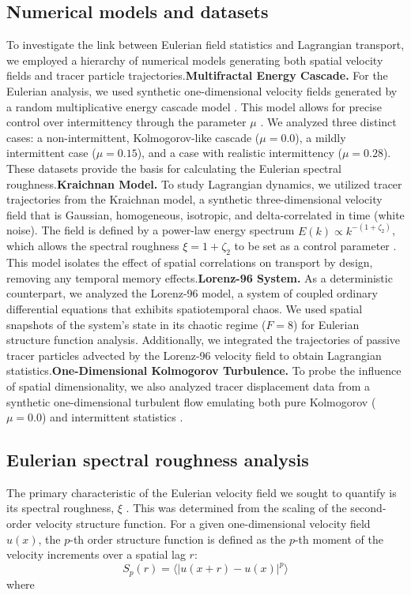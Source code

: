 \documentclass[]{article}
\begin{document}
\subsection{Numerical models and datasets}To investigate the link between Eulerian field statistics and Lagrangian transport, we employed a hierarchy of numerical models generating both spatial velocity fields and tracer particle trajectories.\noindent\textbf{Multifractal Energy Cascade.} For the Eulerian analysis, we used synthetic one-dimensional velocity fields generated by a random multiplicative energy cascade model  \citep{shivamoggi2022generalizedfractaldimensiondissipative}. This model allows for precise control over intermittency through the parameter $\mu$  \citep{arreola2024currentstateatmosphericturbulence}. We analyzed three distinct cases: a non-intermittent, Kolmogorov-like cascade ($\mu=0.0$), a mildly intermittent case ($\mu=0.15$), and a case with realistic intermittency ($\mu=0.28$). These datasets provide the basis for calculating the Eulerian spectral roughness.\noindent\textbf{Kraichnan Model.} To study Lagrangian dynamics, we utilized tracer trajectories from the Kraichnan model, a synthetic three-dimensional velocity field that is Gaussian, homogeneous, isotropic, and delta-correlated in time (white noise). The field is defined by a power-law energy spectrum $E(k) \propto k^{-(1+\zeta_2)}$, which allows the spectral roughness $\xi = 1 + \zeta_2$ to be set as a control parameter  \citep{considera2025transportmultifractalkraichnanflows}. This model isolates the effect of spatial correlations on transport by design, removing any temporal memory effects.\noindent\textbf{Lorenz-96 System.} As a deterministic counterpart, we analyzed the Lorenz-96 model, a system of coupled ordinary differential equations that exhibits spatiotemporal chaos. We used spatial snapshots of the system's state in its chaotic regime ($F=8$) for Eulerian structure function analysis. Additionally, we integrated the trajectories of passive tracer particles advected by the Lorenz-96 velocity field to obtain Lagrangian statistics.\noindent\textbf{One-Dimensional Kolmogorov Turbulence.} To probe the influence of spatial dimensionality, we also analyzed tracer displacement data from a synthetic one-dimensional turbulent flow  \citep{benzi199611dimensionalturbulence,kuksin2021kolmogorovstheoryturbulencerigorous} emulating both pure Kolmogorov ($\mu=0.0$) and intermittent statistics  \citep{drivas2026mathematicaltheoremsturbulence}.\subsection{Eulerian spectral roughness analysis}The primary characteristic of the Eulerian velocity field we sought to quantify is its spectral roughness, $\xi$  \citep{jafari2026statisticalfluxfreezingmagnetic}. This was determined from the scaling of the second-order velocity structure function. For a given one-dimensional velocity field $u(x)$, the $p$-th order structure function is defined as the $p$-th moment of the velocity increments over a spatial lag $r$:\begin{equation}S_p(r) = \langle |u(x+r) - u(x)|^p \rangle\end{equation}where 
\end{document}
